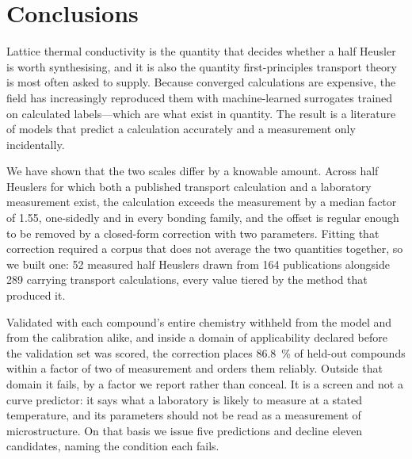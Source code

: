 %
%

\section{Conclusions}
\label{sec:conclusions}

Lattice thermal conductivity is the quantity that decides whether a half Heusler is worth
synthesising, and it is also the quantity first-principles transport theory is most often asked to
supply. Because converged calculations are expensive, the field has increasingly reproduced them
with machine-learned surrogates trained on calculated labels---which are what exist in
quantity. The result is a literature of models that predict a calculation accurately and a
measurement only incidentally.

We have shown that the two scales differ by a knowable amount. Across half Heuslers for which both a
published transport calculation and a laboratory measurement exist, the calculation exceeds the
measurement by a median factor of \num{1.55}, one-sidedly and in every bonding family, and the
offset is regular enough to be removed by a closed-form correction with two parameters. Fitting that
correction required a corpus that does not average the two quantities together, so we built one:
\num{52} measured half Heuslers drawn from \num{164} publications alongside \num{289} carrying
transport calculations, every value tiered by the method that produced it.

Validated with each compound's entire chemistry withheld from the model and from the calibration
alike, and inside a domain of applicability declared before the validation set was scored, the
correction places \SI{86.8}{\percent} of held-out compounds within a factor of two of measurement
and orders them reliably. Outside that domain it fails, by a factor we report rather than conceal.
It is a screen and not a curve predictor: it says what a laboratory is likely to measure at a stated
temperature, and its parameters should not be read as a measurement of microstructure. On that basis
we issue five predictions and decline eleven candidates, naming the condition each fails.

